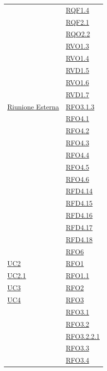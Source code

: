 \begin{longtable}{|>{\centering}m{5cm}|m{5cm}<{\centering}|}
& \hyperlink{RQF1.4}{RQF1.4}\\
& \hyperlink{RQF2.1}{RQF2.1}\\
& \hyperlink{RQO2.2}{RQO2.2}\\
& \hyperlink{RVO1.3}{RVO1.3}\\
& \hyperlink{RVO1.4}{RVO1.4}\\
& \hyperlink{RVD1.5}{RVD1.5}\\
& \hyperlink{RVO1.6}{RVO1.6}\\
& \hyperlink{RVD1.7}{RVD1.7}\\ \hline
\hyperlink{Riunione Esterna}{Riunione Esterna} & \hyperlink{RFO3.1.3}{RFO3.1.3}\\
& \hyperlink{RFO4.1}{RFO4.1}\\
& \hyperlink{RFO4.2}{RFO4.2}\\
& \hyperlink{RFO4.3}{RFO4.3}\\
& \hyperlink{RFO4.4}{RFO4.4}\\
& \hyperlink{RFO4.5}{RFO4.5}\\
& \hyperlink{RFO4.6}{RFO4.6}\\

& \hyperlink{RFD4.14}{RFD4.14}\\
& \hyperlink{RFD4.15}{RFD4.15}\\
& \hyperlink{RFD4.16}{RFD4.16}\\
& \hyperlink{RFD4.17}{RFD4.17}\\
& \hyperlink{RFD4.18}{RFD4.18}\\
& \hyperlink{RFO6}{RFO6}\\ \hline
\hyperref[UC2]{UC2} & \hyperlink{RFO1}{RFO1}\\ \hline
\hyperref[UC2.1]{UC2.1} & \hyperlink{RFO1.1}{RFO1.1}\\ \hline
\hyperref[UC3]{UC3} & \hyperlink{RFO2}{RFO2}\\ \hline
\hyperref[UC4]{UC4} & \hyperlink{RFO3}{RFO3}\\
& \hyperlink{RFO3.1}{RFO3.1}\\
& \hyperlink{RFO3.2}{RFO3.2}\\
& \hyperlink{RFO3.2.2.1}{RFO3.2.2.1}\\
& \hyperlink{RFO3.3}{RFO3.3}\\
& \hyperlink{RFO3.4}{RFO3.4}\\


\end{longtable}
